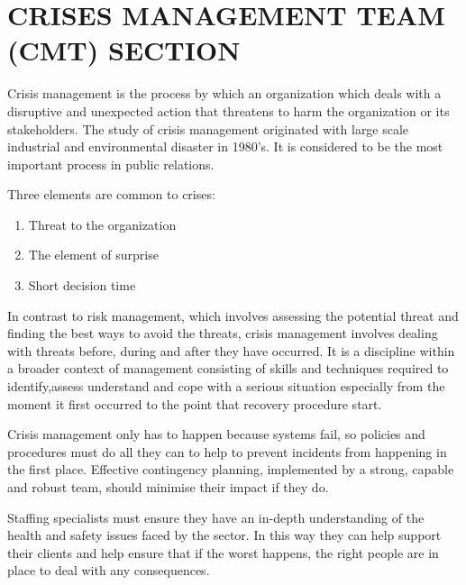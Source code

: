 \chapter{CRISES MANAGEMENT TEAM (CMT) SECTION}

Crisis management is the process by which an organization which
deals with a disruptive and unexpected action that threatens to harm
the organization or its stakeholders. The study of crisis management
originated with large scale industrial and environmental disaster in
1980’s. It is considered to be the most important process in public
relations.

\vspace{1em}


\noindent Three elements are common to crises:

\begin{enumerate}

\item Threat to the organization

\item The element of surprise

\item Short decision time

\end{enumerate}


\vspace{1em}

In contrast to risk management, which involves assessing the
potential threat and finding the best ways to avoid the threats, crisis
management involves dealing with threats before, during and after
they have occurred. It is a discipline within a broader context of
management consisting of skills and techniques required to identify,assess understand and cope with a serious situation especially from
the moment it first occurred to the point that recovery procedure start.

\vspace{1em}

Crisis management only has to happen because systems fail, so policies and procedures must do all 
they can to help to prevent incidents from happening in the first place. Effective contingency planning,
implemented by a strong, capable and robust team, should minimise their impact if they do.

\vspace{2em}

Staffing specialists must ensure they have an in-depth understanding of the health and 
safety issues faced by the sector. In this way they can help support their clients and 
help ensure that if the worst happens, the right people are in place to deal with any consequences.


